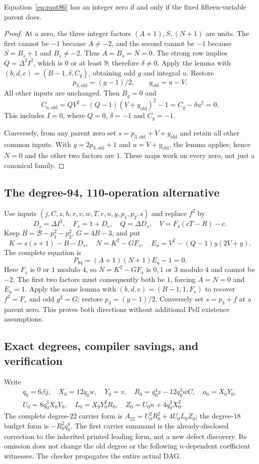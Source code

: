 \begin{proposition}
Equation~\eqref{eq:root86} has an integer zero if and only if the fixed
fifteen-variable parent does.
\end{proposition}
\begin{proof}
At a zero, the three integer factors $(A+1),S,(N+1)$ are units. The first
cannot be $-1$ because $A\ne-2$, and the second cannot be $-1$ because
$S=B_s+1$ and $B_s\ne-2$. Thus $A=B_s=N=0$.
The strong row implies $Q=\Delta^2I^2$, which is $0$ or at least $9$;
therefore $\delta\ne0$. Apply the lemma with
$(b,d,e)=(B-1,\delta,C_y)$, obtaining odd $g$ and integral $u$.
Restore
\[
 p_{3,\mathrm{old}}=(g-1)/2,\qquad y_{\mathrm{old}}=u-V.
\]
All other inputs are unchanged. Then $B_g=0$ and
\[
 C_{a,\mathrm{old}}=QV^2-(Q-1)(V+y_{\mathrm{old}})^2-1
                  =C_y-\delta u^2=0.
\]
This includes $I=0$, where $Q=0$, $\delta=-1$ and $C_y=-1$.

Conversely, from any parent zero set $s=p_{3,\mathrm{old}}+V+y_{\mathrm{old}}$
and retain all other common inputs. With
$g=2p_{3,\mathrm{old}}+1$ and $u=V+y_{\mathrm{old}}$, the lemma applies;
hence $N=0$ and the other two factors are $1$.
These maps work on every zero, not just a canonical family.
\end{proof}

\subsection{The degree-94, 110-operation alternative}
Use inputs $(j,C,z,h,r,v,w,T,c,n,y,p_1,p_2,s)$ and replace $f^2$ by
\[
 D_s=\Delta I^2,\quad F_s=1+D_s,\quad Q=\Delta D_s,
 \quad V=F_s(cT-R)-c.
\]
Keep $B=\mathcal B-p_1^2-p_2^2$, $G=4B-3$, and put
\[
 K=s(s+1)-B-D_s,\quad N=K^2-GF_s,
 \quad E_a=V^2-(Q-1)y(2V+y).
\]
The complete equation is
\[
 \boxed{\;P_{94}=(A+1)(N+1)E_a-1=0.\;}
\]
Here $F_s$ is $0$ or $1$ modulo $4$, so $N=K^2-GF_s$ is $0,1$ or $3$
modulo $4$ and cannot be $-2$. The first two factors must consequently
both be $1$, forcing $A=N=0$ and $E_a=1$. Apply the same lemma with
$(b,d,e)=(B-1,1,F_s)$ to recover $f^2=F_s$ and odd $g^2=G$; restore
$p_3=(g-1)/2$. Conversely set $s=p_3+f$ at a parent zero. This proves
both directions without additional Pell existence assumptions.

\subsection{Exact degrees, compiler savings, and verification}
Write
\begin{gather*}
 q_0=6\beta j,\quad X_0=12q_0w,\quad Y_0=v,\quad
 R_0=q_0^4z-12q_0^3wC,\quad a_0=X_0Y_0,\\
 U_0=8q_0^3X_0Y_0,\quad L_0=X_0Y_0^2R_0,
 \quad Z_0=U_0n+4q_0^3X_0^2.
\end{gather*}
The complete degree-22 carrier form is
$A_{22}=U_0^2R_0^2+4U_0L_0Z_0$; the degree-18 budget form is
$-R_0^2q_0^8$. The first carrier summand is the already-disclosed correction
to the inherited printed leading form, not a new defect discovery.
Its omission does not change the old degree or the following $n$-dependent
coefficient witnesses. The checker propagates the entire actual DAG.

